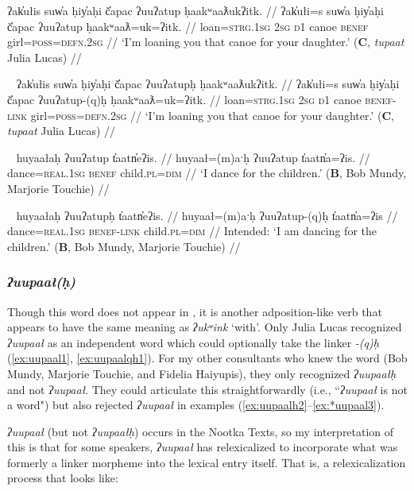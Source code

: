 \ex \label{ex:uatup}
\begingl
\glpreamble ʔak̓ułis suw̓a ḥiy̓aḥi č̓apac ʔuuʔatup ḥaakʷaaƛukʔitk. //
\gla ʔak̓ułi=s suw̓a ḥiy̓aḥi č̓apac ʔuuʔatup ḥaakʷaaƛ=uk=ʔitk. //
\glb loan=\textsc{strg.1sg} \textsc{2sg} \textsc{d1} canoe \textsc{benef} girl=\textsc{poss}=\textsc{defn.2sg} //
\glft `I'm loaning you that canoe for your daughter.' (\textbf{C}, \textit{tupaat} Julia Lucas) //
\endgl
\xe

\ex~ \label{ex:uatuph}
\begingl
\glpreamble ʔak̓ułis suw̓a ḥiy̓aḥi č̓apac ʔuuʔatupḥ ḥaakʷaaƛukʔitk. //
\gla ʔak̓ułi=s suw̓a ḥiy̓aḥi č̓apac ʔuuʔatup-(q)ḥ ḥaakʷaaƛ=uk=ʔitk. //
\glb loan=\textsc{strg.1sg} \textsc{2sg} \textsc{d1} canoe \textsc{benef}-\textsc{link} girl=\textsc{poss}=\textsc{defn.2sg} //
\glft `I'm loaning you that canoe for your daughter.' (\textbf{C}, \textit{tupaat} Julia Lucas) //
\endgl
\xe

\ex~ \label{ex:uatup2}
\begingl
\glpreamble huyaałaḥ ʔuuʔatup t̓aatn̓eʔis. //
\gla huyaał=(m)aˑḥ ʔuuʔatup t̓aatn̓a=ʔis. //
\glb dance=\textsc{real.1sg} \textsc{benef} child.\textsc{pl}=\textsc{dim} //
\glft `I dance for the children.' (\textbf{B}, Bob Mundy, Marjorie Touchie) //
\endgl
\xe

\ex~ \label{ex:uatuph2}
\begingl
\glpreamble *huyaałaḥ ʔuuʔatupḥ t̓aatn̓eʔis. //
\gla huyaał=(m)aˑḥ ʔuuʔatup-(q)ḥ t̓aatn̓a=ʔis //
\glb dance=\textsc{real.1sg} \textsc{benef}-\textsc{link} child.\textsc{pl}=\textsc{dim} //
\glft Intended: `I am dancing for the children.' (\textbf{B}, Bob Mundy, Marjorie Touchie) //
\endgl
\xe

\subsubsection{\textit{ʔuupaał(ḥ)}} Though this word does not appear in \cite{woo2007b}, it is another adposition-like verb that appears to have the same meaning as \textit{ʔukʷink} `with'. Only Julia Lucas recognized \textit{ʔuupaał} as an independent word which could optionally take the linker \textit{-(q)ḥ} (\ref{ex:uupaal1}, \ref{ex:uupaalqh1}). For my other consultants who knew the word (Bob Mundy, Marjorie Touchie, and Fidelia Haiyupis), they only recognized \textit{ʔuupaałḥ} and not \textit{ʔuupaał}. They could articulate this straightforwardly (i.e., ``\textit{ʔuupaał} is not a word") but also rejected \textit{ʔuupaał} in examples (\ref{ex:uupaalh2}--\ref{ex:*uupaal3}).

\textit{ʔuupaał} (but not \textit{ʔuupaałḥ}) occurs in the Nootka Texts, so my interpretation of this is that for some speakers, \textit{ʔuupaał} has relexicalized to incorporate what was formerly a linker morpheme into the lexical entry itself. That is, a relexicalization process that looks like:

